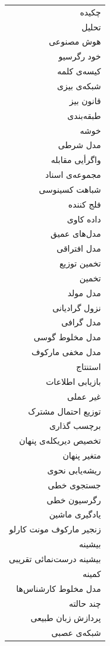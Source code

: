 \begin{table}[h]
\begin{minipage}{0.5\textwidth}
	\begin{tabular}{r}
	چکیده\\
	تحلیل\\
	هوش مصنوعی\\
	خود رگرسیو\\
	کیسه‌ی کلمه\\
	شبکه‌ی بیزی\\
	قانون بیز\\
	طبقه‌بندی\\
	خوشه\\
	مدل شرطی\\
	واگرأیی مقابله\\
	مجموعه‌ی اسناد\\
	شباهت کسینوسی\\
	فلج کننده\\
	داده کاوی\\
	مدل‌های عمیق\\
	مدل افتراقی\\
	تخمین توزیع\\
	تخمین\\
	مدل مولد\\
	نزول گرادیانی\\
	مدل گرافی\\
	مدل مخلوط گوسی\\
	مدل مخفی‌ مارکوف\\
	استنتاج\\
	بازیابی اطلاعات\\
	غیر عملی\\
	توزیع احتمال مشترک\\
	برچسب گذاری\\
	تخصیص دیریکله‌ی پنهان\\
	متغیر پنهان\\
	ریشه‌یابی‌ نحوی\\
	جستجوی خطی\\
	رگرسیون خطی\\
	یادگیری ماشین\\
	زنجیر مارکوف مونت کارلو\\
	بیشینه\\
	بیشینه درست‌نمائی تقریبی\\
	کمینه\\
	مدل مخلوط کارشناس‌ها\\
	چند حالته\\
	پردازش زبان طبیعی\\
	شبکه‌ی عصبی\\
	

\end{tabular}
\end{minipage}
\end{table}
